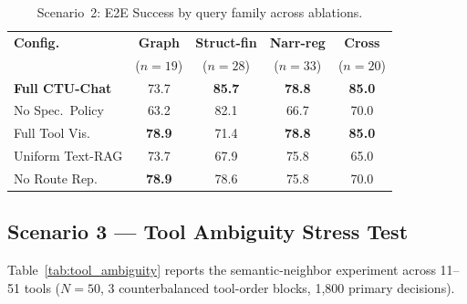 \begin{table}[!htbp]
\centering
\caption{Scenario~2: E2E Success by query family across ablations.}
\label{tab:ablation_breakdown}
{\small\setlength{\tabcolsep}{4pt}
\begin{tabular}{lcccc}
\toprule
\textbf{Config.} & \textbf{Graph} & \textbf{Struct-fin} & \textbf{Narr-reg} & \textbf{Cross} \\
 & ($n{=}19$) & ($n{=}28$) & ($n{=}33$) & ($n{=}20$) \\
\midrule
\textbf{Full CTU-Chat} & 73.7 & \textbf{85.7} & \textbf{78.8} & \textbf{85.0} \\
No Spec.~Policy  & 63.2 & 82.1 & 66.7 & 70.0 \\
Full Tool Vis.   & \textbf{78.9} & 71.4 & \textbf{78.8} & \textbf{85.0} \\
Uniform Text-RAG & 73.7 & 67.9 & 75.8 & 65.0 \\
No Route Rep.    & \textbf{78.9} & 78.6 & 75.8 & 70.0 \\
\bottomrule
\end{tabular}}
\end{table}

\subsection{Scenario 3 --- Tool Ambiguity Stress Test}
\label{sec:s3_results}

Table~\ref{tab:tool_ambiguity} reports the semantic-neighbor experiment across 11--51 tools ($N{=}50$, 3 counterbalanced tool-order blocks, 1,800 primary decisions).

